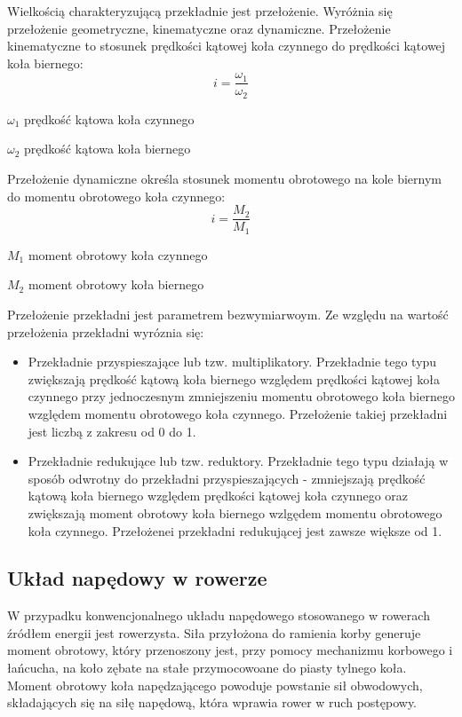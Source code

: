 Wielkością charakteryzującą przekładnie jest przełożenie. Wyróżnia się przełożenie geometryczne, kinematyczne oraz dynamiczne. Przełożenie kinematyczne to stosunek prędkości kątowej koła czynnego do prędkości kątowej koła biernego:
\begin{equation}
    i = \frac{\omega_1}{\omega_2}
    \label{eq:przelozenieKinematyczne}
\end{equation}
\begin{eqwhere}[2cm]
	\item[$\omega_1$] prędkość kątowa koła czynnego
	\item[$\omega_2$] prędkość kątowa koła biernego
\end{eqwhere}

Przełożenie dynamiczne określa stosunek momentu obrotowego na kole biernym do momentu obrotowego koła czynnego:
\begin{equation}
    i = \frac{M_2}{M_1}
    \label{eq:przelozenieDynamiczne}
\end{equation}
\begin{eqwhere}[2cm]
	\item[$M_1$] moment obrotowy koła czynnego
	\item[$M_2$] moment obrotowy koła biernego
\end{eqwhere}

Przełożenie przekładni jest parametrem bezwymiarwoym. Ze względu na wartość przełożenia przekładni wyróznia się:
\begin{itemize}
\item
Przekładnie przyspieszające lub tzw. multiplikatory. Przekładnie tego typu zwiększają prędkość kątową koła biernego względem prędkości kątowej koła czynnego przy jednoczesnym zmniejszeniu momentu obrotowego koła biernego względem momentu obrotowego koła czynnego. Przełożenie takiej przekładni jest liczbą z zakresu od 0 do 1.
\item
Przekładnie redukujące lub tzw. reduktory. Przekładnie tego typu działają w sposób odwrotny do przekładni przyspieszających - zmniejszają prędkość kątową koła biernego względem prędkości kątowej koła czynnego oraz zwiększają moment obrotowy koła biernego wzlgędem momentu obrotowego koła czynnego. Przełożenei przekładni redukującej jest zawsze większe od 1.
\end{itemize} 
\subsection{Układ napędowy w rowerze}
W przypadku konwencjonalnego układu napędowego stosowanego w rowerach źródłem energii jest rowerzysta. Siła przyłożona do ramienia korby generuje moment obrotowy, który przenoszony jest, przy pomocy mechanizmu korbowego i łańcucha, na koło zębate na stałe przymocowoane do piasty tylnego koła. Moment obrotowy koła napędzającego powoduje powstanie sił obwodowych, składających się na siłę napędową, która wprawia rower w ruch postępowy.

